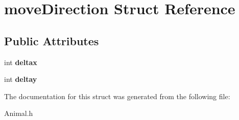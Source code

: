 \hypertarget{structmove_direction}{}\section{move\+Direction Struct Reference}
\label{structmove_direction}
\subsection*{Public Attributes}
\begin{DoxyCompactItemize}
\item 
int {\bfseries deltax}\hypertarget{structmove_direction_a3178a4b35b2c721742ba680a99ee526c}{}\label{structmove_direction_a3178a4b35b2c721742ba680a99ee526c}

\item 
int {\bfseries deltay}\hypertarget{structmove_direction_a67c6f8ff956f588e8a534cecbbf18248}{}\label{structmove_direction_a67c6f8ff956f588e8a534cecbbf18248}

\end{DoxyCompactItemize}


The documentation for this struct was generated from the following file\+:\begin{DoxyCompactItemize}
\item 
Animal.\+h\end{DoxyCompactItemize}
